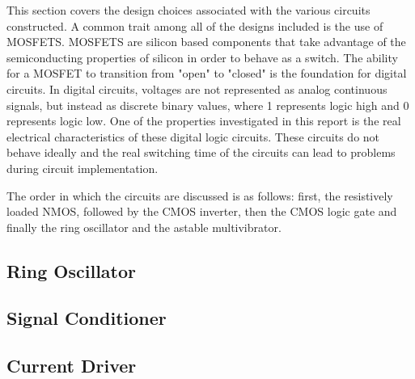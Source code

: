 



This section covers the design choices associated with the various circuits constructed. A common trait among all of the designs included is the use of  MOSFETS. MOSFETS are silicon based components that take advantage of the semiconducting properties of silicon in order to behave as a switch. The ability for a MOSFET to transition from "open" to "closed" is the foundation for digital circuits. In digital circuits, voltages are not represented as analog continuous signals, but instead as discrete binary values, where 1 represents logic high and 0 represents logic low. One of the properties investigated in this report is the real electrical characteristics of these digital logic circuits. These circuits do not behave ideally and the real switching time of the circuits can lead to problems during circuit implementation.

The order in which the circuits are discussed is as follows: first, the resistively loaded NMOS, followed by the CMOS inverter, then the CMOS logic gate and finally the ring oscillator and the astable multivibrator. 

\subsection{Ring Oscillator}


\subsection{Signal Conditioner}


\subsection{Current Driver}

	






